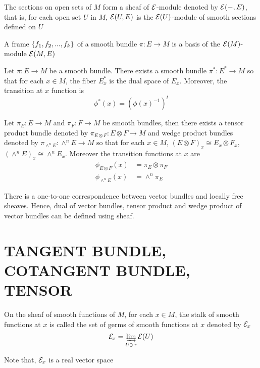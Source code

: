 \begin{remark}
	The sections on open sets of $M$ form a sheaf of $\mathcal{E}$-module denoted by $\mathcal{E}(-, E)$, that is, for each open set $U$ in $M$, $\mathcal{E}(U, E)$ is the $\mathcal{E}(U)$-module of smooth sections defined on $U$
\end{remark}

\begin{definition}[frame]
	A frame $\{f_1, f_2, ..., f_k\}$ of a smooth bundle $\pi: E \to M$ is a basis of the $\mathcal{E}(M)$-module $\mathcal{E}(M, E)$
\end{definition}

\begin{proposition}
	Let $\pi: E \to M$ be a smooth bundle. There exists a smooth bundle $\pi^*: E^* \to M$ so that for each $x \in M$, the fiber $E_x^*$ is the dual space of $E_x$. Moreover, the transition at $x$ function is
	$$
		\phi^*(x) = (\phi(x)^{-1})^t
	$$
\end{proposition}

\begin{proposition}
	Let $\pi_E: E \to M$ and $\pi_F: F \to M$ be smooth bundles, then there exists a tensor product bundle denoted by $\pi_{E \otimes F}: E \otimes F \to M$ and wedge product bundles denoted by $\pi_{\wedge^n E}: \wedge^n E \to M$ so that for each $x \in M$, $(E \otimes F)_x \cong E_x \otimes F_x$, $(\wedge^n E)_x \cong \wedge^n E_x$. Moreover the transition functions at $x$ are
	\begin{align*}
		\phi_{E \otimes F}(x) &= \pi_E \otimes \pi_F \\
		\phi_{\wedge^n E}(x) &= \wedge^n \pi_E
	\end{align*}
\end{proposition}

\begin{remark}
	There is a one-to-one correspondence between vector bundles and locally free sheaves. Hence, dual of vector bundles, tensor product and wedge product of vector bundles can be defined using sheaf.
\end{remark}

\section{TANGENT BUNDLE, COTANGENT BUNDLE, TENSOR}

\begin{definition}
	On the sheaf of smooth functions of $M$, for each $x \in M$, the stalk of smooth functions at $x$ is called the set of germs of smooth functions at $x$ denoted by $\mathcal{E}_x$
	$$
		\mathcal{E}_x = \varinjlim_{U \ni x} \mathcal{E}(U)
	$$
	
	Note that, $\mathcal{E}_x$ is a real vector space
\end{definition}

